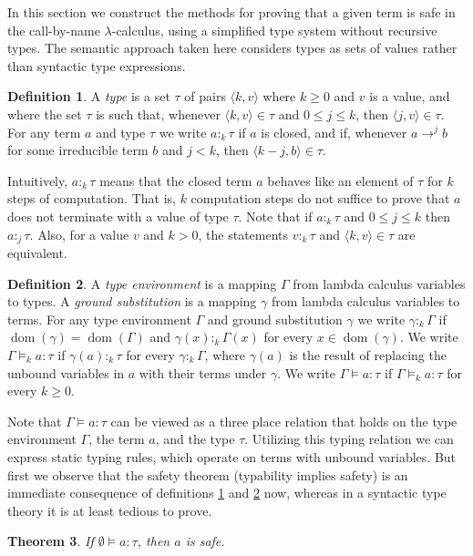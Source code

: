 \documentclass[12pt,a4paper,draft]{article}
\theoremstyle{definition}
\newtheorem{definition}{Definition}
\theoremstyle{plain}
\newtheorem{theorem}[definition]{Theorem}
\newcommand{\pair}[1]{\ensuremath{\langle{#1}\rangle}}
\DeclareMathOperator{\dom}{dom}
\begin{document}
In this section we construct the methods for proving that a given term is safe in the call-by-name
$\lambda$-calculus, using a simplified type system without recursive types. The semantic approach
taken here considers types as sets of values rather than syntactic type expressions.
\begin{definition} \label{def:Type}
  A \emph{type} is a set $\tau$ of pairs $\pair{k,v}$ where $k \ge 0$ and $v$ is a value, and where the
  set $\tau$ is such that, whenever $\pair{k,v} \in \tau$ and $0 \le j \le k$, then $\pair{j,v} \in \tau$.
  For any term $a$ and type $\tau$ we write $a :_k \tau$ if $a$ is closed, and if, whenever $a \to^j b$ for some
  irreducible term $b$ and $j < k$, then $\pair{k-j,b} \in \tau$.
\end{definition}
Intuitively, $a :_k \tau$ means that the closed term $a$ behaves like an element of $\tau$ for $k$ steps
of computation. That is, $k$ computation steps do not suffice to prove that $a$ does not terminate with
a value of type $\tau$. Note that if $a :_k \tau$ and $0 \le j \le k$ then $a :_j \tau$. Also, for a value
$v$ and $k > 0$, the statements $v :_k \tau$ and $\pair{k,v} \in \tau$ are equivalent.
\begin{definition} \label{def:Typing}
  A \emph{type environment} is a mapping $\Gamma$ from lambda calculus variables to types. A
  \emph{ground substitution} is a mapping $\gamma$ from lambda calculus variables to terms. For
  any type environment $\Gamma$ and ground substitution $\gamma$ we write $\gamma :_k \Gamma$ if
  $\dom(\gamma) = \dom(\Gamma)$ and $\gamma(x) :_k \Gamma(x)$ for every $x \in \dom(\gamma)$. We
  write $\Gamma \models_k a : \tau$ if $\gamma(a) :_k \tau$ for every $\gamma :_k \Gamma$,
  where $\gamma(a)$ is the result of replacing the unbound variables in $a$ with their terms under
  $\gamma$. We write $\Gamma \models a : \tau$ if $\Gamma \models_k a : \tau$ for every $k \ge 0$.
\end{definition}
Note that $\Gamma \models a : \tau$ can be viewed as a three place relation that holds on the
type environment $\Gamma$, the term $a$, and the type $\tau$. Utilizing this typing relation
we can express static typing rules, which operate on terms with unbound variables. But first
we observe that the safety theorem (typability implies safety) is an immediate consequence
of definitions \ref{def:Type} and \ref{def:Typing} now, whereas in a syntactic type theory
it is at least tedious to prove.
\begin{theorem}
  If $\emptyset \models a : \tau$, then $a$ is safe.
\end{theorem}
\end{document}
